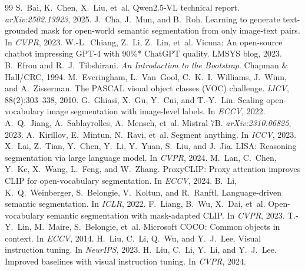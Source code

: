 \documentclass{article}
\begin{document}
{
\small

\begin{thebibliography}{99}
 S.~Bai, K.~Chen, X.~Liu, et~al. Qwen2.5-VL technical report. \emph{arXiv:2502.13923}, 2025.
 J.~Cha, J.~Mun, and B.~Roh. Learning to generate text-grounded mask for open-world semantic segmentation from only image-text pairs. In \emph{CVPR}, 2023.
 W.-L.~Chiang, Z.~Li, Z.~Lin, et~al. Vicuna: An open-source chatbot impressing GPT-4 with 90\%* ChatGPT quality. LMSYS blog, 2023.
 B.~Efron and R.~J.~Tibshirani. \emph{An Introduction to the Bootstrap}. Chapman \& Hall/CRC, 1994.
 M.~Everingham, L.~Van~Gool, C.~K.~I.~Williams, J.~Winn, and A.~Zisserman. The PASCAL visual object classes (VOC) challenge. \emph{IJCV}, 88(2):303--338, 2010.
 G.~Ghiasi, X.~Gu, Y.~Cui, and T.-Y.~Lin. Scaling open-vocabulary image segmentation with image-level labels. In \emph{ECCV}, 2022.
 A.~Q.~Jiang, A.~Sablayrolles, A.~Mensch, et~al. Mistral 7B. \emph{arXiv:2310.06825}, 2023.
 A.~Kirillov, E.~Mintun, N.~Ravi, et~al. Segment anything. In \emph{ICCV}, 2023.
 X.~Lai, Z.~Tian, Y.~Chen, Y.~Li, Y.~Yuan, S.~Liu, and J.~Jia. LISA: Reasoning segmentation via large language model. In \emph{CVPR}, 2024.
 M.~Lan, C.~Chen, Y.~Ke, X.~Wang, L.~Feng, and W.~Zhang. ProxyCLIP: Proxy attention improves CLIP for open-vocabulary segmentation. In \emph{ECCV}, 2024.
 B.~Li, K.~Q.~Weinberger, S.~Belongie, V.~Koltun, and R.~Ranftl. Language-driven semantic segmentation. In \emph{ICLR}, 2022.
 F.~Liang, B.~Wu, X.~Dai, et~al. Open-vocabulary semantic segmentation with mask-adapted CLIP. In \emph{CVPR}, 2023.
 T.-Y.~Lin, M.~Maire, S.~Belongie, et~al. Microsoft COCO: Common objects in context. In \emph{ECCV}, 2014.
 H.~Liu, C.~Li, Q.~Wu, and Y.~J.~Lee. Visual instruction tuning. In \emph{NeurIPS}, 2023.
 H.~Liu, C.~Li, Y.~Li, and Y.~J.~Lee. Improved baselines with visual instruction tuning. In \emph{CVPR}, 2024.

\end{thebibliography}}
\end{document}
